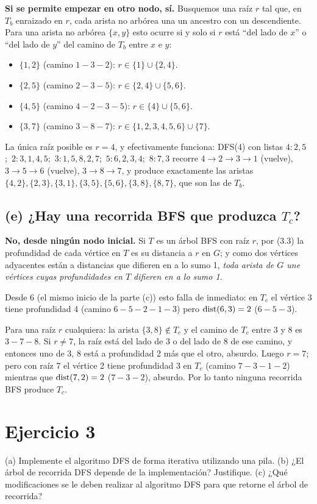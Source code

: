 \textbf{Si se permite empezar en otro nodo, sí.} Busquemos una raíz $r$ tal que, en $T_b$ enraizado en
$r$, cada arista no arbórea una un ancestro con un descendiente. Para una arista no arbórea
$\{x,y\}$ esto ocurre si y solo si $r$ está ``del lado de $x$'' o ``del lado de $y$'' del camino de
$T_b$ entre $x$ e $y$:
\begin{itemize}[nosep]
  \item $\{1,2\}$ (camino $1-3-2$): $r\in\{1\}\cup\{2,4\}$.
  \item $\{2,5\}$ (camino $2-3-5$): $r\in\{2,4\}\cup\{5,6\}$.
  \item $\{4,5\}$ (camino $4-2-3-5$): $r\in\{4\}\cup\{5,6\}$.
  \item $\{3,7\}$ (camino $3-8-7$): $r\in\{1,2,3,4,5,6\}\cup\{7\}$.
\end{itemize}
La única raíz posible es $r=4$, y efectivamente funciona: \textsc{DFS}(4) con listas
$4\!:\!2,5$;\ $2\!:\!3,1,4,5$;\ $3\!:\!1,5,8,2,7$;\ $5\!:\!6,2,3,4$;\ $8\!:\!7,3$ recorre
$4\to2\to3\to1$ (vuelve), $3\to5\to6$ (vuelve), $3\to8\to7$, y produce exactamente las aristas
$\{4,2\},\{2,3\},\{3,1\},\{3,5\},\{5,6\},\{3,8\},\{8,7\}$, que son las de $T_b$.

\subsection*{(e) ¿Hay una recorrida BFS que produzca $T_c$?}
\textbf{No, desde ningún nodo inicial.} Si $T$ es un árbol BFS con raíz $r$, por (3.3) la
profundidad de cada vértice en $T$ es su distancia a $r$ en $G$; y como dos vértices adyacentes
están a distancias que difieren en a lo sumo 1, \emph{toda arista de $G$ une vértices cuyas
profundidades en $T$ difieren en a lo sumo 1}.

Desde 6 (el mismo inicio de la parte (c)) esto falla de inmediato: en $T_c$ el vértice 3 tiene
profundidad 4 (camino $6-5-2-1-3$) pero $\mathrm{dist}(6,3)=2$ ($6-5-3$).

Para una raíz $r$ cualquiera: la arista $\{3,8\}\notin T_c$ y el camino de $T_c$ entre 3 y 8 es
$3-7-8$. Si $r\neq 7$, la raíz está del lado de 3 o del lado de 8 de ese camino, y entonces uno de
3, 8 está a profundidad 2 más que el otro, absurdo. Luego $r=7$; pero con raíz 7 el vértice 2 tiene
profundidad 3 en $T_c$ (camino $7-3-1-2$) mientras que $\mathrm{dist}(7,2)=2$ ($7-3-2$), absurdo. Por lo
tanto ninguna recorrida BFS produce $T_c$.

\section{Ejercicio 3}
\begin{enunciado}
(a) Implemente el algoritmo DFS de forma iterativa utilizando una pila.
(b) ¿El árbol de recorrida DFS depende de la implementación? Justifique.
(c) ¿Qué modificaciones se le deben realizar al algoritmo DFS para que retorne el árbol de recorrida?
\end{enunciado}

